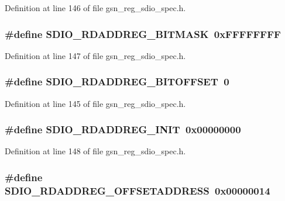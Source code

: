 Definition at line 146 of file gsn\_\-reg\_\-sdio\_\-spec.h.

\hypertarget{a00571_aa1b2939f1373069e83210497dd8d2ff7}{
\subsubsection[{SDIO\_\-RDADDREG\_\-BITMASK}]{\setlength{\rightskip}{0pt plus 5cm}\#define SDIO\_\-RDADDREG\_\-BITMASK~0xFFFFFFFF}}
\label{a00571_aa1b2939f1373069e83210497dd8d2ff7}


Definition at line 147 of file gsn\_\-reg\_\-sdio\_\-spec.h.

\hypertarget{a00571_a772b8db46f8ba83686cc67d081fa45da}{
\subsubsection[{SDIO\_\-RDADDREG\_\-BITOFFSET}]{\setlength{\rightskip}{0pt plus 5cm}\#define SDIO\_\-RDADDREG\_\-BITOFFSET~0}}
\label{a00571_a772b8db46f8ba83686cc67d081fa45da}


Definition at line 145 of file gsn\_\-reg\_\-sdio\_\-spec.h.

\hypertarget{a00571_aa95fb0fcecb89ac91630e2173738065f}{
\subsubsection[{SDIO\_\-RDADDREG\_\-INIT}]{\setlength{\rightskip}{0pt plus 5cm}\#define SDIO\_\-RDADDREG\_\-INIT~0x00000000}}
\label{a00571_aa95fb0fcecb89ac91630e2173738065f}


Definition at line 148 of file gsn\_\-reg\_\-sdio\_\-spec.h.

\hypertarget{a00571_ad53b6828db9f634839338c5a677b27a8}{
\subsubsection[{SDIO\_\-RDADDREG\_\-OFFSETADDRESS}]{\setlength{\rightskip}{0pt plus 5cm}\#define SDIO\_\-RDADDREG\_\-OFFSETADDRESS~0x00000014}}
\label{a00571_ad53b6828db9f634839338c5a677b27a8}


